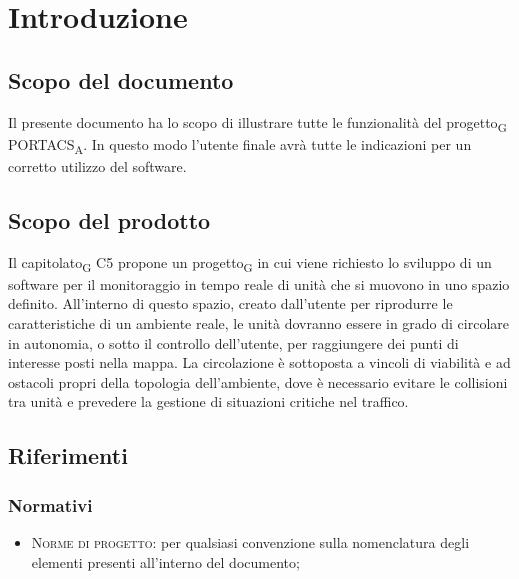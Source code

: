 \section{Introduzione}
\subsection{Scopo del documento}
    Il presente documento ha lo scopo di illustrare tutte le funzionalità del progetto\textsubscript{G} PORTACS\textsubscript{A}. In questo modo l'utente finale avrà tutte le indicazioni per un corretto utilizzo del software.


\subsection{Scopo del prodotto}

    Il capitolato\textsubscript{G} C5 propone un progetto\textsubscript{G} in cui viene richiesto lo sviluppo di un software per il monitoraggio in tempo reale di unità che si muovono in uno spazio definito. All'interno di questo spazio, creato dall'utente per riprodurre le caratteristiche di un ambiente reale, le unità dovranno essere in grado di circolare in autonomia, o sotto il controllo dell'utente, per raggiungere dei punti di interesse posti nella mappa. La circolazione è sottoposta a vincoli di viabilità e ad ostacoli propri della topologia dell'ambiente, dove è necessario evitare le collisioni tra unità e prevedere la gestione di situazioni critiche nel traffico.

\subsection{Riferimenti}
\label{ref}
    \subsubsection{Normativi}
    \begin{itemize}
    	\item \textsc{Norme di progetto}: per qualsiasi convenzione sulla nomenclatura degli elementi presenti all'interno del documento;
    	
    \end{itemize}

